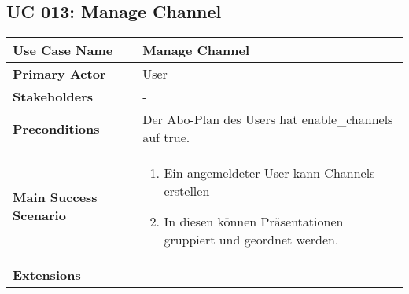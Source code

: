 \subsection{UC 013: Manage Channel}
\label{uc:013-manage-channel}

\begin{tabular}{|l|p{}|}
\hline
\textbf{Use Case Name} 	&	Manage Channel	\\ \hline
\textbf{Primary Actor} 	&	User	\\ \hline
\textbf{Stakeholders}	&	-	\\ \hline
\textbf{Preconditions}	&	Der Abo-Plan des Users hat enable_channels auf true.	\\ \hline
\textbf{Main Success Scenario}	&
\begin{enumerate}
	\item Ein angemeldeter User kann Channels erstellen
	\item In diesen können Präsentationen gruppiert und geordnet werden.
\end{enumerate}
\\ \hline
\textbf{Extensions}	& 	\\ \hline
\end{tabular}